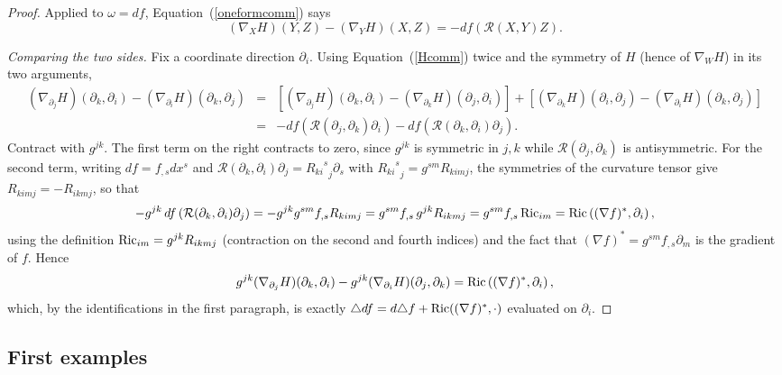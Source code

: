 \begin{proof}
Applied to $\omega=df$, Equation~(\ref{oneformcomm}) says
\begin{equation}\label{Hcomm}
(\nabla_XH)(Y,Z)-(\nabla_YH)(X,Z)=-df\left({\mathcal
R}(X,Y)Z\right).
\end{equation}

\emph{Comparing the two sides.} Fix a coordinate direction
$\partial_i$. Using Equation~(\ref{Hcomm}) twice and the symmetry
of $H$ (hence of $\nabla_WH$) in its two arguments,
\begin{eqnarray*}
(\nabla_{\partial_j}H)(\partial_k,\partial_i)
-(\nabla_{\partial_i}H)(\partial_k,\partial_j)
& = & \left[(\nabla_{\partial_j}H)(\partial_k,\partial_i)
-(\nabla_{\partial_k}H)(\partial_j,\partial_i)\right]
+\left[(\nabla_{\partial_k}H)(\partial_i,\partial_j)
-(\nabla_{\partial_i}H)(\partial_k,\partial_j)\right]\\
& = & -df\left({\mathcal R}(\partial_j,\partial_k)\partial_i\right)
-df\left({\mathcal R}(\partial_k,\partial_i)\partial_j\right).
\end{eqnarray*}
Contract with $g^{jk}$. The first term on the right contracts to
zero, since $g^{jk}$ is symmetric in $j,k$ while ${\mathcal
R}(\partial_j,\partial_k)$ is antisymmetric. For the second term,
writing $df=f_{,s}dx^s$ and ${\mathcal
R}(\partial_k,\partial_i)\partial_j={{R_{ki}}^s}_j\partial_s$ with
${{R_{ki}}^s}_j=g^{sm}R_{kimj}$, the symmetries of the curvature
tensor give $R_{kimj}=-R_{ikmj}$, so that
$$-g^{jk}\,df\left({\mathcal R}(\partial_k,\partial_i)\partial_j\right)
=-g^{jk}g^{sm}f_{,s}R_{kimj}
=g^{sm}f_{,s}\,g^{jk}R_{ikmj}
=g^{sm}f_{,s}\operatorname{Ric}_{im}
=\operatorname{Ric}\left((\nabla f)^*,\partial_i\right),$$
using the definition $\operatorname{Ric}_{im}=g^{jk}R_{ikmj}$ (contraction on the
second and fourth indices) and the fact that $(\nabla
f)^*=g^{sm}f_{,s}\partial_m$ is the gradient of $f$. Hence
$$g^{jk}(\nabla_{\partial_j}H)(\partial_k,\partial_i)
-g^{jk}(\nabla_{\partial_i}H)(\partial_j,\partial_k)
=\operatorname{Ric}\left((\nabla f)^*,\partial_i\right),$$
which, by the identifications in the first paragraph, is exactly
$\triangle df=d\triangle f+\operatorname{Ric}((\nabla f)^*,\cdot)$ evaluated on
$\partial_i$.
\end{proof}




\subsection{First examples}

